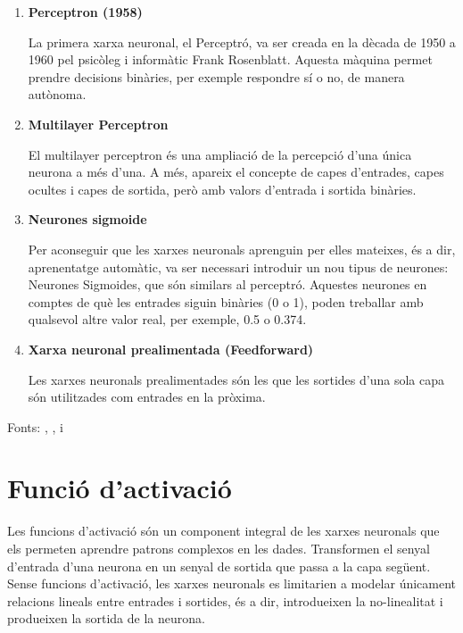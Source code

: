 \begin{enumerate}
    \item \textbf{Perceptron (1958)}

    La primera xarxa neuronal, el Perceptró, va ser creada en la dècada de 1950 a 1960 pel psicòleg i informàtic Frank Rosenblatt. Aquesta màquina permet prendre decisions binàries, per exemple respondre sí o no, de manera autònoma.

    \item \textbf{Multilayer Perceptron}

    El multilayer perceptron és una ampliació de la percepció d'una única neurona a més d'una. A més, apareix el concepte de capes d'entrades, capes ocultes i capes de sortida, però amb valors d'entrada i sortida binàries.

    \item \textbf{Neurones sigmoide}

    Per aconseguir que les xarxes neuronals aprenguin per elles mateixes, és a dir, aprenentatge automàtic, va ser necessari introduir un nou tipus de neurones: Neurones Sigmoides, que són similars al perceptró. Aquestes neurones en comptes de què les entrades siguin binàries (0 o 1), poden treballar amb qualsevol altre valor real, per exemple, 0.5 o 0.374.

    \item \textbf{Xarxa neuronal prealimentada (Feedforward)}

    Les xarxes neuronals prealimentades són les que les sortides d'una sola capa són utilitzades com entrades en la pròxima.
\end{enumerate}
Fonts: \cite{TreballFinalDeGrau}, \cite{Medium}, \cite{MediumSigmoid} i \cite{FeedForward}
\section{Funció d'activació}\label{Activació}

Les funcions d'activació són un component integral de les xarxes neuronals que els permeten aprendre patrons complexos en les dades. Transformen el senyal d'entrada d'una neurona en un senyal de sortida que passa a la capa següent. Sense funcions d'activació, les xarxes neuronals es limitarien a modelar únicament relacions lineals entre entrades i sortides, és a dir, introdueixen la no-linealitat i produeixen la sortida de la neurona.

